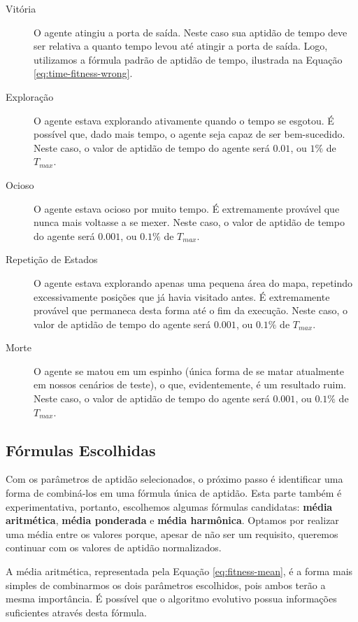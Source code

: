 \begin{description}
	\item[Vitória]
		O agente atingiu a porta de saída. Neste caso sua aptidão de tempo deve
		ser relativa a quanto tempo levou até atingir a porta de saída. Logo,
		utilizamos a fórmula padrão de aptidão de tempo, ilustrada na Equação
		\ref{eq:time-fitness-wrong}.

	\item[Exploração]
		O agente estava explorando ativamente quando o tempo se esgotou. É
		possível que, dado mais tempo, o agente seja capaz de ser bem-sucedido.
		Neste caso, o valor de aptidão de tempo do agente será $0.01$, ou $1\%$
		de $T_{max}$.

	\item[Ocioso]
		O agente estava ocioso por muito tempo. É extremamente provável que
		nunca mais voltasse a se mexer. Neste caso, o valor de aptidão de tempo
		do agente será $0.001$, ou $0.1\%$ de $T_{max}$.

	\item[Repetição de Estados]
		O agente estava explorando apenas uma pequena área do mapa, repetindo
		excessivamente posições que já havia visitado antes. É extremamente
		provável que permaneca desta forma até o fim da execução. Neste caso, o
		valor de aptidão de tempo do agente será $0.001$, ou $0.1\%$ de
		$T_{max}$.


	\item[Morte]
		O agente se matou em um espinho (única forma de se matar atualmente em
		nossos cenários de teste), o que, evidentemente, é um resultado ruim.
		Neste caso, o valor de aptidão de tempo do agente será $0.001$, ou
		$0.1\%$ de $T_{max}$.
\end{description}


\subsection{Fórmulas Escolhidas}
Com os parâmetros de aptidão selecionados, o próximo passo é identificar uma
forma de combiná-los em uma fórmula única de aptidão. Esta parte também é
experimentativa, portanto, escolhemos algumas fórmulas candidatas: \textbf{média
aritmética}, \textbf{média ponderada} e \textbf{média harmônica}. Optamos por
realizar uma média entre os valores porque, apesar de não ser um requisito,
queremos continuar com os valores de aptidão normalizados.

A média aritmética, representada pela Equação \ref{eq:fitness-mean}, é a forma
mais simples de combinarmos os dois parâmetros escolhidos, pois ambos terão a
mesma importância. É possível que o algoritmo evolutivo possua informações
suficientes através desta fórmula.

